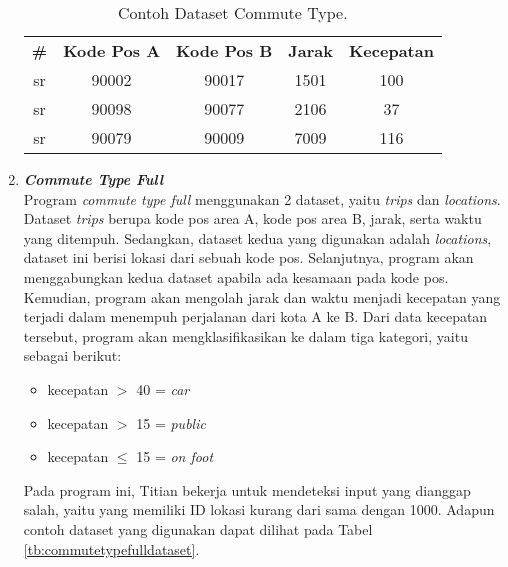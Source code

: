 \begin{enumerate}
            \begin{longtable}{|c|c|c|c|c|}
                  \caption{Contoh Dataset Commute Type.}
                  \label{tb:commutetypedataset} \\
                  \hline
                  \rowcolor[HTML]{C0C0C0}
                  \textbf{\#} & \textbf{Kode Pos A} & \textbf{Kode Pos B} & \textbf{Jarak} & \textbf{Kecepatan} \\
                  sr & 90002 & 90017 & 1501 & 100 \\
                  sr & 90098 & 90077 & 2106 & 37 \\
                  sr & 90079 & 90009 & 7009 & 116 \\
                  \hline
            \end{longtable}

      \item \emph{\textbf{Commute Type Full}} \\
      

            Program \emph{commute type full} menggunakan 2 dataset, 
            yaitu \emph{trips} dan \emph{locations}. Dataset 
            \emph{trips} berupa kode pos area A, kode pos area B, 
            jarak, serta waktu yang ditempuh. Sedangkan, dataset 
            kedua yang digunakan adalah \emph{locations}, dataset 
            ini berisi lokasi dari sebuah kode pos. Selanjutnya, 
            program akan menggabungkan kedua dataset apabila ada 
            kesamaan pada kode pos. Kemudian, program akan mengolah 
            jarak dan waktu menjadi kecepatan yang terjadi dalam 
            menempuh perjalanan dari kota A ke B. Dari data kecepatan 
            tersebut, program akan mengklasifikasikan ke dalam tiga 
            kategori, yaitu sebagai berikut:
            \begin{itemize}
                  \item kecepatan $ > $ 40 = \emph{car}
                  \item kecepatan $ > $ 15 = \emph{public}
                  \item kecepatan $ \leq $ 15 = \emph{on foot}
            \end{itemize}
            Pada program ini, Titian bekerja untuk mendeteksi input yang dianggap salah, yaitu yang memiliki ID lokasi kurang dari sama dengan 1000.
            Adapun contoh dataset yang digunakan dapat 
            dilihat pada Tabel \ref{tb:commutetypefulldataset}.
            

\end{enumerate}
